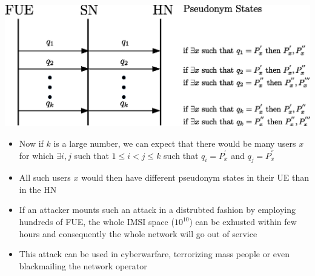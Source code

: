\documentclass[portrait,a0]{a0poster}
\begin{document}
\begin{multicols}{2}
\begin{center}
\begin{minipage}[t]{0.9\linewidth} %
\vspace{.5cm} %
\includegraphics[width=1\linewidth]{attack.eps}
\hspace{0pt}
\vspace{.5cm} %
\end{minipage} 
\end{center}

\begin{itemize}
\item Now if $k$ is a large number, we can expect that there would be many users $x$ for which $\exists i,j$ such that $1 \leq i < j \leq k$ such that $q_i=P_x^{'}$ and $q_j=P_x^{''}$
\item  All such users $x$ would then have different pseudonym states in their UE than in the HN
\item If an attacker mounts such an attack in a distrubted fashion by employing hundreds of FUE, the whole IMSI space ($10^{10}$) can be exhusted within few hours and consequently the whole network will go out of service
\item This attack can be used in cyberwarfare, terrorizing mass people or even blackmailing the network operator
\end{itemize}


\end{multicols}
\end{document}
